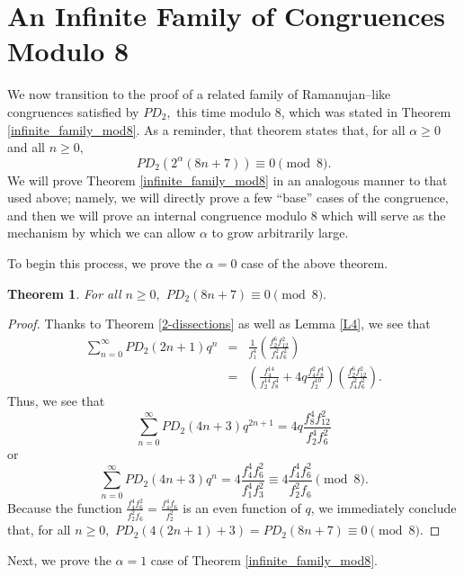 \documentclass{amsart}
\newtheorem{theorem}{Theorem}[section]
\begin{document}
\section{An Infinite Family of Congruences Modulo 8}
We now transition to the proof of a related family of Ramanujan--like congruences satisfied by $PD_2,$ this time modulo 8, which was stated in Theorem \ref{infinite_family_mod8}.  As a reminder, that theorem states that, for all $\alpha \geq 0$ and all $n\geq 0,$
$$PD_2(2^\alpha(8n+7)) \equiv 0 \pmod{8}.$$  
We will prove Theorem \ref{infinite_family_mod8} in an analogous manner to that used above; namely, we will directly prove a few ``base'' cases of the congruence, and then we will prove an internal congruence modulo 8 which will serve as the mechanism by which we can allow $\alpha $ to grow arbitrarily large.  

To begin this process, we prove the $\alpha =0$ case of the above theorem.  
\begin{theorem}
\label{8n7_mod8}
 For all $n\geq 0,$ $PD_2(8n+7) \equiv 0 \pmod{8}.$   
\end{theorem}
\begin{proof}
Thanks to Theorem \ref{2-dissections} as well as Lemma \ref{L4}, we see that 
\begin{eqnarray*}
\sum_{n=0}^{\infty} PD_2(2n+1)q^{n} 
&=&
\frac{1}{f_1^4}\left( \frac{f_2^6f_{12}^2}{f_4^2f_{6}^2}  \right)  \\
&=&
\left( \frac{f_4^{14}}{f_2^{14}f_8^4} + 4q\frac{f_4^2f_8^4}{f_2^{10}} \right)\left( \frac{f_2^6f_{12}^2}{f_4^2f_{6}^2}  \right).
\end{eqnarray*}
Thus, we see that 
$$
\sum_{n=0}^{\infty} PD_2(4n+3)q^{2n+1} = 4q\frac{f_8^4f_{12}^2}{f_2^4f_6^2} 
$$
or 
$$
\sum_{n=0}^{\infty} PD_2(4n+3)q^{n} = 4\frac{f_4^4f_{6}^2}{f_1^4f_3^2} \equiv  4\frac{f_4^4f_{6}^2}{f_2^2f_6} \pmod{8}.
$$
Because the function $\frac{f_4^4f_{6}^2}{f_2^2f_6} = \frac{f_4^4f_{6}}{f_2^2} $ is an even function of $q$, we immediately conclude that, for all $n\geq 0,$ $PD_2(4(2n+1)+3) = PD_2(8n+7) \equiv 0 \pmod{8}.$
\end{proof}
Next, we prove the $\alpha=1$ case of Theorem \ref{infinite_family_mod8}.
\end{document}
